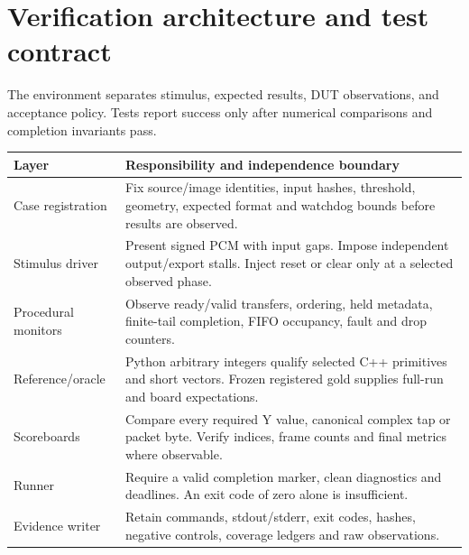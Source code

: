 \documentclass[11pt,letterpaper]{article}
\newcommand{\page}[1]{\clearpage\section{#1}}
\begin{document}
\page{Verification architecture and test contract}
The environment separates stimulus, expected results, DUT observations, and acceptance policy. Tests report success only after numerical comparisons and completion invariants pass.
\par\noindent\begin{minipage}{\linewidth}
\noindent\begin{tabularx}{\linewidth}{P{1.35in}L}
\toprule
\textbf{Layer} & \textbf{Responsibility and independence boundary}\\
\midrule
Case registration & Fix source/image identities, input hashes, threshold, geometry, expected format and watchdog bounds before results are observed.\\
Stimulus driver & Present signed PCM with input gaps. Impose independent output/export stalls. Inject reset or clear only at a selected observed phase.\\
Procedural monitors & Observe ready/valid transfers, ordering, held metadata, finite-tail completion, FIFO occupancy, fault and drop counters.\\
Reference/oracle & Python arbitrary integers qualify selected C++ primitives and short vectors. Frozen registered gold supplies full-run and board expectations.\\
Scoreboards & Compare every required Y value, canonical complex tap or packet byte. Verify indices, frame counts and final metrics where observable.\\
Runner & Require a valid completion marker, clean diagnostics and deadlines. An exit code of zero alone is insufficient.\\
Evidence writer & Retain commands, stdout/stderr, exit codes, hashes, negative controls, coverage ledgers and raw observations.\\
\bottomrule
\end{tabularx}\par\end{minipage}\par
\end{document}
